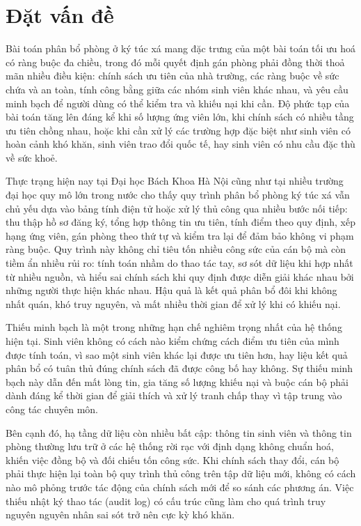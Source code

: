 ﻿\documentclass[a4paper,12pt,openany,oneside]{report}
\begin{document}
\section{Đặt vấn đề}

Bài toán phân bổ phòng ở ký túc xá mang đặc trưng của một bài toán tối ưu hoá
có ràng buộc đa chiều, trong đó mỗi quyết định gán phòng phải đồng thời thoả
mãn nhiều điều kiện: chính sách ưu tiên của nhà trường, các ràng buộc về sức
chứa và an toàn, tính công bằng giữa các nhóm sinh viên khác nhau, và yêu cầu
minh bạch để người dùng có thể kiểm tra và khiếu nại khi cần. Độ phức tạp của
bài toán tăng lên đáng kể khi số lượng ứng viên lớn, khi chính sách có nhiều
tầng ưu tiên chồng nhau, hoặc khi cần xử lý các trường hợp đặc biệt như sinh
viên có hoàn cảnh khó khăn, sinh viên trao đổi quốc tế, hay sinh viên có nhu
cầu đặc thù về sức khoẻ.

Thực trạng hiện nay tại Đại học Bách Khoa Hà Nội cũng như tại nhiều trường đại
học quy mô lớn trong nước cho thấy quy trình phân bổ phòng ký túc xá vẫn chủ
yếu dựa vào bảng tính điện tử hoặc xử lý thủ công qua nhiều bước nối tiếp: thu
thập hồ sơ đăng ký, tổng hợp thông tin ưu tiên, tính điểm theo quy định, xếp
hạng ứng viên, gán phòng theo thứ tự và kiểm tra lại để đảm bảo không vi phạm
ràng buộc. Quy trình này không chỉ tiêu tốn nhiều công sức của cán bộ mà còn
tiềm ẩn nhiều rủi ro: tính toán nhầm do thao tác tay, sơ sót dữ liệu khi hợp
nhất từ nhiều nguồn, và hiểu sai chính sách khi quy định được diễn giải khác
nhau bởi những người thực hiện khác nhau. Hậu quả là kết quả phân bổ đôi khi
không nhất quán, khó truy nguyên, và mất nhiều thời gian để xử lý khi có khiếu
nại.

Thiếu minh bạch là một trong những hạn chế nghiêm trọng nhất của hệ thống hiện
tại. Sinh viên không có cách nào kiểm chứng cách điểm ưu tiên của mình được
tính toán, vì sao một sinh viên khác lại được ưu tiên hơn, hay liệu kết quả phân
bổ có tuân thủ đúng chính sách đã được công bố hay không. Sự thiếu minh bạch
này dẫn đến mất lòng tin, gia tăng số lượng khiếu nại và buộc cán bộ phải dành
đáng kể thời gian để giải thích và xử lý tranh chấp thay vì tập trung vào công
tác chuyên môn.

Bên cạnh đó, hạ tầng dữ liệu còn nhiều bất cập: thông tin sinh viên và thông
tin phòng thường lưu trữ ở các hệ thống rời rạc với định dạng không chuẩn hoá,
khiến việc đồng bộ và đối chiếu tốn công sức. Khi chính sách thay đổi, cán bộ
phải thực hiện lại toàn bộ quy trình thủ công trên tập dữ liệu mới, không có
cách nào mô phỏng trước tác động của chính sách mới để so sánh các phương án.
Việc thiếu nhật ký thao tác (audit log) có cấu trúc cũng làm cho quá trình truy
nguyên nguyên nhân sai sót trở nên cực kỳ khó khăn.
\end{document}
